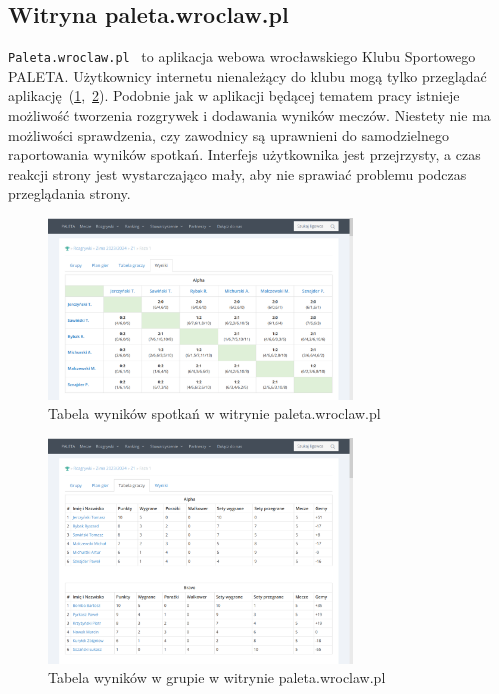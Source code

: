 \documentclass[shortabstract]{iithesis}
\begin{document}
\subsection{Witryna paleta.wroclaw.pl}
\texttt{Paleta.wroclaw.pl}~\cite{PaletaWroclaw} to aplikacja webowa wrocławskiego Klubu Sportowego PALETA.
Użytkownicy internetu nienależący do klubu mogą tylko przeglądać aplikację~(\ref{fig:paleta_match_results},~\ref{fig:paleta_table_results}).
Podobnie jak w aplikacji będącej tematem pracy istnieje możliwość tworzenia rozgrywek i dodawania wyników meczów.
Niestety nie ma możliwości sprawdzenia, czy zawodnicy są uprawnieni do samodzielnego raportowania wyników spotkań.
Interfejs użytkownika jest przejrzysty, a czas reakcji strony jest wystarczająco mały, aby nie sprawiać problemu podczas przeglądania strony.
\begin{figure}[H]
    \centering
    \includegraphics[width=0.72\textwidth,valign=t]{assets/alt_rozw/paleta_wyniki.png}
    \caption{Tabela wyników spotkań w witrynie paleta.wroclaw.pl}
    \label{fig:paleta_match_results}
\end{figure}
\begin{figure}[H]
    \centering
    \includegraphics[width=0.72\textwidth,valign=t]{assets/alt_rozw/paleta_tabela.png}
    \caption{Tabela wyników w grupie w witrynie paleta.wroclaw.pl}
    \label{fig:paleta_table_results}
\end{figure}
\end{document}
